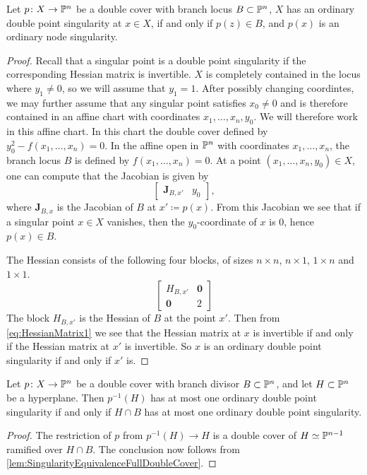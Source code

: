 \begin{lemma}
  \label{lem:SingularityEquivalenceFullDoubleCover}
  Let $p \from X \to \P^n$ be a double cover with branch locus $B \subset \P^n$, $X$ has an ordinary double point singularity at $x \in X$, if and only if $p(z) \in B$, and $p(x)$ is an ordinary node singularity.
\end{lemma}
\begin{proof}
Recall that a singular point is a double point singularity if the corresponding Hessian matrix is invertible. $X$ is completely contained in the locus where $y_1 \neq 0$, so we will assume that $y_1 = 1$. After possibly changing coordintes, we may further assume that any singular point satisfies $x_0 \neq 0$ and is therefore contained in an affine chart with coordinates $x_1,\dots,x_n,y_0$. We will therefore work in this affine chart.
In this chart the double cover defined by $y_0^2 - f(x_1,\dots,x_n) = 0$. In the affine open in $\P^n$ with coordinates $x_1,\dots,x_n$, the branch locus $B$ is defined by $f(x_1,\dots,x_n)=0$. At a point $(x_1,\dots,x_n,y_0) \in X$, one can compute that the Jacobian is given by
\[
  \begin{bmatrix}
    \mathbf{J}_{B,x'} & y_0
  \end{bmatrix},
\]
where $\mathbf{J}_{B,x}$ is the Jacobian of $B$ at $x' \coloneqq p(x)$. From this Jacobian we see that if a singular point $x \in X$ vanishes, then the $y_0$-coordinate of $x$ is $0$, hence $p(x) \in B$.

 The Hessian consists of the following four blocks, of sizes $n \times n$, $n\times 1$, $1 \times n$ and $1 \times 1$.
 \begin{equation}
   \label{eq:HessianMatrix1}
     \begin{bmatrix}
    H_{B,x'} & \mathbf{0} \\
    \mathbf{0} & 2
  \end{bmatrix}
 \end{equation}
The block $H_{B,x'}$ is the Hessian of $B$ at the point $x'$. Then from \eqref{eq:HessianMatrix1} we see that the Hessian matrix at $x$ is invertible if and only if the Hessian matrix at $x'$ is invertible. So $x$ is an ordinary double point singularity if and only if $x'$ is.
\end{proof}

\begin{corollary}
	\label{lem:SingularityEquivalence}
	Let $p \from X \to \P^n$ be a double cover with branch divisor $B \subset \P^n$, and let $H \subset \P^n$ be a hyperplane. Then $p^{-1}(H)$ has at most one ordinary double point singularity if and only if $H \cap B$ has at most one ordinary double point singularity.
\end{corollary}
\begin{proof}
	The restriction of $p$ from $p^{-1}(H) \to H$ is a double cover of $H \simeq \P^{n-1}$ ramified over $H \cap B$. The conclusion now follows from \cref{lem:SingularityEquivalenceFullDoubleCover}.
\end{proof}

